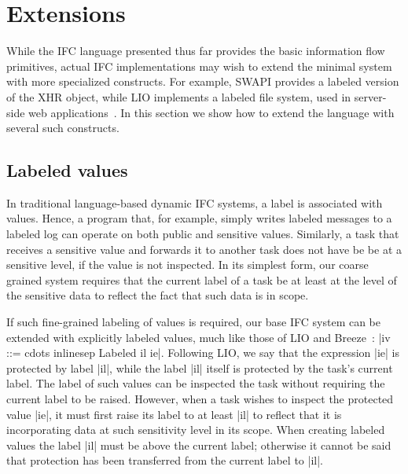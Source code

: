 \section{Extensions}
\label{sec:extensions}
\label{sec:extensions:labeled}


While the IFC language presented thus far provides the basic
information flow primitives, actual IFC implementations
may wish to extend the minimal system with more specialized
constructs.
For example, SWAPI provides a labeled version of the XHR object, while
LIO implements a labeled file system, used in server-side web
applications~\cite{hails}.
In this section we show how to extend the language with several such
constructs.
%

\subsection{Labeled values}
In traditional language-based dynamic IFC systems, a label is
associated with values.
%
Hence, a program that, for example, simply writes labeled messages to
a labeled log can operate on both public and sensitive values.
Similarly, a task that receives a sensitive value and forwards it
to another task does not have be be at a sensitive level, if the
value is not inspected.
%
In its simplest form, our coarse grained system requires that the
current label of a task be at least at the level of the sensitive data
to reflect the fact that such data is in scope.

If such fine-grained labeling of values is required, our base IFC
system can be extended with explicitly labeled
values, much like those of LIO and
Breeze~\cite{lio, Hritcu:2013:YIB:2497621.2498098}: |iv ::= cdots
inlinesep Labeled il ie|.
%
Following LIO, we say that the expression |ie| is protected by label |il|,
while the label |il| itself is protected by the task's current label.
%
%
The label of such values can be inspected the task without
requiring the current label to be raised.
%
However, when a task wishes to inspect the protected value |ie|, it
must first raise its label to at least |il| to reflect that it is
incorporating data at such sensitivity level in its scope.
%
When creating labeled values the label |il| must be above
the current label; otherwise it cannot be said that protection has
been transferred from the current label to |il|.
%


